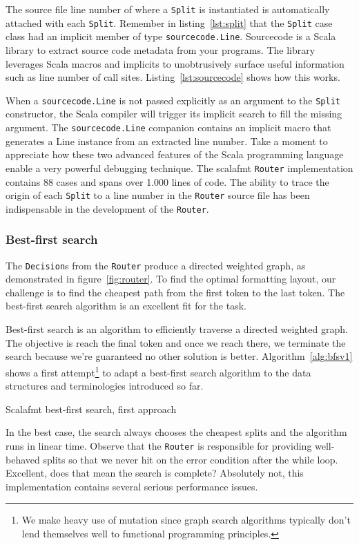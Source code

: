 The source file line number of where a \texttt{Split} is instantiated is automatically attached with each \texttt{Split}.
Remember in listing~\ref{lst:split} that the \texttt{Split} case class had an implicit member of type \texttt{sourcecode.Line}.
Sourcecode\autocite{lihao91:online} is a Scala library to extract source code metadata from your programs.
The library leverages Scala macros and implicits to unobtrusively surface useful information such as line number of call sites.
Listing~\ref{lst:sourcecode} shows how this works.

When a \texttt{sourcecode.Line} is not passed explicitly as an argument to the \texttt{Split} constructor, the Scala compiler will trigger its implicit search to fill the missing argument.
The \texttt{sourcecode.Line} companion contains an implicit macro that generates a Line instance from an extracted line number.
Take a moment to appreciate how these two advanced features of the Scala programming language enable a very powerful debugging technique.
The scalafmt \texttt{Router} implementation contains 88 cases and spans over 1.000 lines of code.
The ability to trace the origin of each \texttt{Split} to a line number in the \texttt{Router} source file has been indispensable in the development of the \texttt{Router}.

\subsubsection{Best-first search}
The \texttt{Decision}s from the \texttt{Router} produce a directed weighted graph, as demonstrated in figure~\ref{fig:router}.
To find the optimal formatting layout, our challenge is to find the cheapest path from the first token to the last token.
The best-first search algorithm\autocite{pearl_heuristics:_1984} is an excellent fit for the task.

Best-first search is an algorithm to efficiently traverse a directed weighted graph.
The objective is reach the final token and once we reach there, we terminate the search because we're guaranteed no other solution is better.
Algorithm~\ref{alg:bfsv1} shows a first attempt\footnote{
  We make heavy use of mutation since graph search algorithms typically don't lend themselves well to functional programming principles.
} to adapt a best-first search algorithm to the data structures and terminologies introduced so far.
\begin{algorithm}
  \caption{Scalafmt best-first search, first approach}\label{alg:bfsv1}
  
\end{algorithm}
In the best case, the search always chooses the cheapest splits and the algorithm runs in linear time.
Observe that the \texttt{Router} is responsible for providing well-behaved splits so that we never hit on the error condition after the while loop.
Excellent, does that mean the search is complete?
Absolutely not, this implementation contains several serious performance issues.

